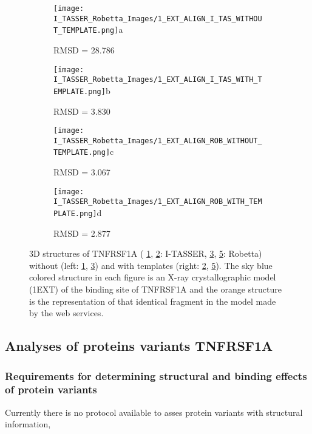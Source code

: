 	\begin{figure}[!ht]
		\centering
		\begin{subfigure}{0.45\textwidth}
			\texttt{[image: I\_TASSER\_Robetta\_Images/1\_EXT\_ALIGN\_I\_TAS\_WITHOUT\_TEMPLATE.png]}{a}
			\caption{RMSD = 28.786}
			\label{fig:RES_I_TASSER_Without}
		\end{subfigure}
		\begin{subfigure}{0.45\textwidth}
			\texttt{[image: I\_TASSER\_Robetta\_Images/1\_EXT\_ALIGN\_I\_TAS\_WITH\_TEMPLATE.png]}{b}
			\caption{RMSD =  3.830}
			\label{fig:RES_I_TASSER_With}
		\end{subfigure}
		\begin{subfigure}{0.45\textwidth}
			\texttt{[image: I\_TASSER\_Robetta\_Images/1\_EXT\_ALIGN\_ROB\_WITHOUT\_TEMPLATE.png]}{c}
			\caption{RMSD =  3.067}
			\label{fig:RES_Robetta_Without}
		\end{subfigure}
		\begin{subfigure}{0.45\textwidth}
			\texttt{[image: I\_TASSER\_Robetta\_Images/1\_EXT\_ALIGN\_ROB\_WITH\_TEMPLATE.png]}{d}
			\caption{RMSD =  2.877}
			\label{fig:RES_Robetta_With}
		\end{subfigure}
		\caption[I-TASSER and Robetta models with and without templates]{3D structures of TNFRSF1A ( \ref{fig:RES_I_TASSER_Without}, \ref{fig:RES_I_TASSER_With}: I-TASSER, \ref{fig:RES_Robetta_Without}, \ref{fig:RES_Robetta_With}: Robetta) without (left: \ref{fig:RES_I_TASSER_Without}, \ref{fig:RES_Robetta_Without}) and with templates (right: \ref{fig:RES_I_TASSER_With}, \ref{fig:RES_Robetta_With}). The sky blue colored structure in each figure is an X-ray crystallographic model (1EXT) of the binding site of TNFRSF1A and the orange structure is the representation of that identical fragment in the model made by the web services.}
	\end{figure}
	\label{subsubsec:RES_Expanding_Models}

\newpage
\subsection{Analyses of proteins variants TNFRSF1A}
	\subsubsection{Requirements for determining structural and binding effects of protein variants}
	Currently there is no protocol available to asses protein variants with structural information, 
	
